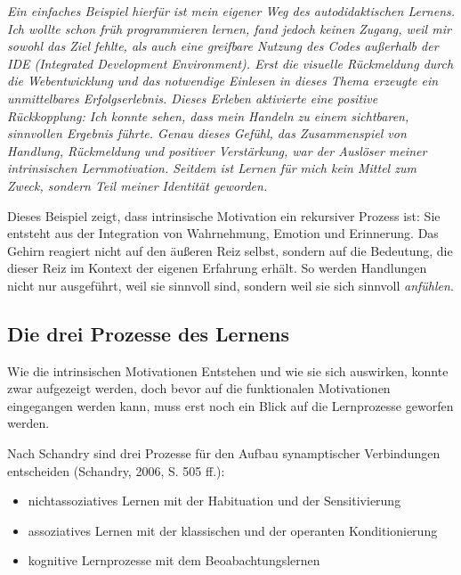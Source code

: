 \begin{reflexion}
\smallskip
\textit{Ein einfaches Beispiel hierfür ist mein eigener Weg des autodidaktischen Lernens. Ich wollte schon früh programmieren lernen, fand jedoch keinen Zugang, weil mir sowohl das Ziel fehlte, als auch eine greifbare Nutzung des Codes außerhalb der IDE (Integrated Development Environment). Erst die visuelle Rückmeldung durch die Webentwicklung und das notwendige Einlesen in dieses Thema erzeugte ein unmittelbares Erfolgserlebnis. Dieses Erleben aktivierte eine positive Rückkopplung: Ich konnte sehen, dass mein Handeln zu einem sichtbaren, sinnvollen Ergebnis führte. Genau dieses Gefühl, das Zusammenspiel von Handlung, Rückmeldung und positiver Verstärkung, war der Auslöser meiner intrinsischen Lernmotivation. Seitdem ist Lernen für mich kein Mittel zum Zweck, sondern Teil meiner Identität geworden.}
\end{reflexion}

Dieses Beispiel zeigt, dass intrinsische Motivation ein rekursiver Prozess ist: Sie entsteht aus der Integration von Wahrnehmung, Emotion und Erinnerung. Das Gehirn reagiert nicht auf den äußeren Reiz selbst, sondern auf die Bedeutung, die dieser Reiz im Kontext der eigenen Erfahrung erhält. So werden Handlungen nicht nur ausgeführt, weil sie sinnvoll sind, sondern weil sie sich sinnvoll \emph{anfühlen}.


\subsection*{Die drei Prozesse des Lernens}

Wie die intrinsischen Motivationen Entstehen und wie sie sich auswirken, konnte zwar aufgezeigt werden, doch bevor auf die funktionalen Motivationen eingegangen werden kann, muss erst noch ein Blick auf die Lernprozesse geworfen werden.

Nach Schandry sind drei Prozesse für den Aufbau synamptischer Verbindungen entscheiden (Schandry, 2006, S. 505 ff.):

\begin{itemize}
  \item nichtassoziatives Lernen mit der Habituation und der Sensitivierung
  \item assoziatives Lernen mit der klassischen und der operanten Konditionierung 
  \item kognitive Lernprozesse mit dem Beoabachtungslernen
\end{itemize}


